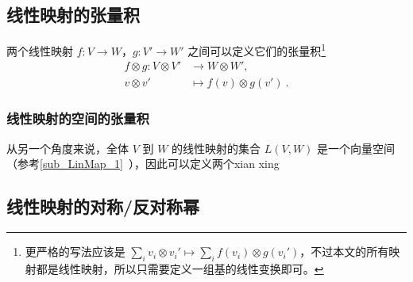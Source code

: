 
\begin{issues}
\issueDraft
{}
\end{issues}

\subsection{线性映射的张量积}

两个线性映射 $f: V \to W$，$g: V' \to W'$ 之间可以定义它们的张量积\footnote{更严格的写法应该是 $\sum_i v_i \otimes v_i' \mapsto \sum_i f(v_i) \otimes g(v_i')$，不过本文的所有映射都是线性映射，所以只需要定义一组基的线性变换即可。}
\begin{equation}
\begin{aligned}
f \otimes g: V \otimes V' &\to W \otimes W', \\
v \otimes v' &\mapsto f(v) \otimes g(v')~.
\end{aligned}
\end{equation}


\subsubsection{线性映射的空间的张量积}

从另一个角度来说，全体 $V$ 到 $W$ 的线性映射的集合 $L(V, W)$ 是一个向量空间（参考\autoref{sub_LinMap_1}~），因此可以定义两个xian xing



\subsection{线性映射的对称/反对称幂}

